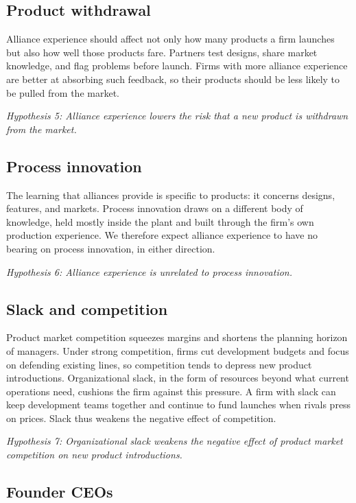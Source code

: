 \documentclass[12pt]{article}
\begin{document}
\subsection{Product withdrawal}

Alliance experience should affect not only how many products a firm launches but also how well those products fare. Partners test designs, share market knowledge, and flag problems before launch. Firms with more alliance experience are better at absorbing such feedback, so their products should be less likely to be pulled from the market.

\textit{Hypothesis 5: Alliance experience lowers the risk that a new product is withdrawn from the market.}

\subsection{Process innovation}

The learning that alliances provide is specific to products: it concerns designs, features, and markets. Process innovation draws on a different body of knowledge, held mostly inside the plant and built through the firm's own production experience. We therefore expect alliance experience to have no bearing on process innovation, in either direction.

\textit{Hypothesis 6: Alliance experience is unrelated to process innovation.}

\subsection{Slack and competition}

Product market competition squeezes margins and shortens the planning horizon of managers. Under strong competition, firms cut development budgets and focus on defending existing lines, so competition tends to depress new product introductions. Organizational slack, in the form of resources beyond what current operations need, cushions the firm against this pressure. A firm with slack can keep development teams together and continue to fund launches when rivals press on prices. Slack thus weakens the negative effect of competition.

\textit{Hypothesis 7: Organizational slack weakens the negative effect of product market competition on new product introductions.}

\subsection{Founder CEOs}
\end{document}
